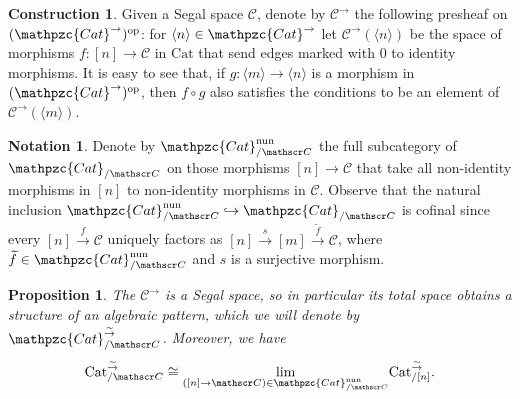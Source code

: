 \documentclass[a4paper, reqno]{amsart}
\newtheorem{prop}[theorem]{Proposition}
\theoremstyle{definition}
\newtheorem{notation}[theorem]{Notation}
\newtheorem{construction}[theorem]{Construction}
\newcommand\cC{\mathscr C}
\newcommand\op{\mathrm{op}}
\newcommand\cat{\mathrm{Cat}}
\newcommand\ccat{\mathpzc{Cat}}
\newcommand\nun{\mathrm{nun}}
\newcommand\bn{\langle n\rangle}
\newcommand\bm{\langle m\rangle}
\newcommand\wrr{{\overset{\sim}{\rightarrow}}}
\begin{document}
\begin{construction}\label{constr:overset}
Given a Segal space $\cC$, denote by $\cC^\rightarrow$ the following presheaf on $(\ccat^\rightarrow)^\op$: for $\bn\in\ccat^\rightarrow$ let $\cC^\rightarrow(\bn)$ be the space of morphisms $f:[n]\rightarrow\cC$ in $\cat$ that send edges marked with $0$ to identity morphisms. It is easy to see that, if $g:\bm\rightarrow\bn$ is a morphism in $(\ccat^\rightarrow)^\op$, then $f\circ g$ also satisfies the conditions to be an element of $\cC^\rightarrow(\bm)$.
\end{construction}
\begin{notation}\label{not:nun}
Denote by $\ccat^\nun_{/\cC}$ the full subcategory of $\ccat_{/\cC}$ on those morphisms $[n]\rightarrow\cC$ that take all non-identity morphisms in $[n]$ to non-identity morphisms in $\cC$. Observe that the natural inclusion $\ccat_{/\cC}^\nun\hookrightarrow\ccat_{/\cC}$ is cofinal since every $[n]\xrightarrow{f}\cC$ uniquely factors as $[n]\xrightarrow{s}[m]\xrightarrow{\widetilde{f}}\cC$, where $\widetilde{f}\in\ccat^\nun_{/\cC}$ and $s$ is a surjective morphism.
\end{notation}
\begin{prop}\label{prop:wrr_colim}
The $\cC^\rightarrow$ is a Segal space, so in particular its total space obtains a structure of an algebraic pattern, which we will denote by $\ccat^\wrr_{/\cC}$. Moreover, we have 
\[\cat^\wrr_{/\cC}\cong \underset{([n]\rightarrow\cC)\in\ccat^\nun_{/\cC}}{\lim}\cat^\wrr_{/[n]}.\]
\end{prop}
\end{document}

